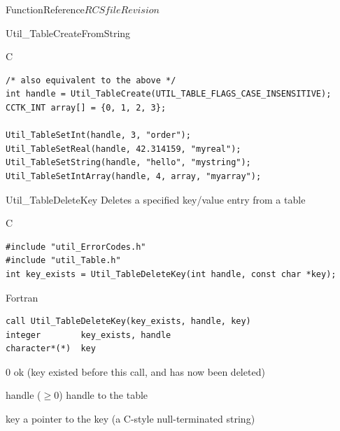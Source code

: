 \begin{cactuspart}{FunctionReference}{$RCSfile$}{$Revision$}
\begin{FunctionDescription}{Util\_TableCreateFromString}
\begin{ExampleSection}
\begin{Example}{C}
\begin{verbatim}
/* also equivalent to the above */
int handle = Util_TableCreate(UTIL_TABLE_FLAGS_CASE_INSENSITIVE);
CCTK_INT array[] = {0, 1, 2, 3};

Util_TableSetInt(handle, 3, "order");
Util_TableSetReal(handle, 42.314159, "myreal");
Util_TableSetString(handle, "hello", "mystring");
Util_TableSetIntArray(handle, 4, array, "myarray");
\end{verbatim}
\end{Example}
\end{ExampleSection}
\end{FunctionDescription}


\begin{FunctionDescription}{Util\_TableDeleteKey}
\label{Util-TableDeleteKey}
Deletes a specified key/value entry from a table

\begin{SynopsisSection}
\begin{Synopsis}{C}
\begin{verbatim}
#include "util_ErrorCodes.h"
#include "util_Table.h"
int key_exists = Util_TableDeleteKey(int handle, const char *key);
\end{verbatim}
\end{Synopsis}
\begin{Synopsis}{Fortran}
\begin{verbatim}
call Util_TableDeleteKey(key_exists, handle, key)
integer        key_exists, handle
character*(*)  key
\end{verbatim}
\end{Synopsis}
\end{SynopsisSection}

\begin{ResultSection}
\begin{Result}{\rm 0}
ok (key existed before this call, and has now been deleted)
\end{Result}
\end{ResultSection}

\begin{ParameterSection}
\begin{Parameter}{handle ($\ge 0$)}
handle to the table
\end{Parameter}
\begin{Parameter}{key}
a pointer to the key (a C-style null-terminated string)
\end{Parameter}
\end{ParameterSection}


\end{FunctionDescription}
\end{cactuspart}

